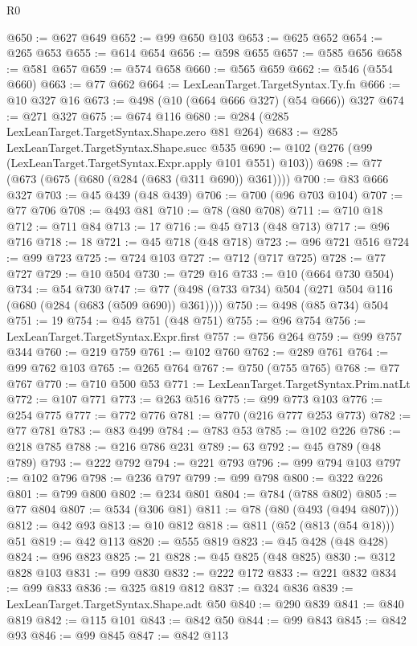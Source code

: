 \begin{lexlean}{R0}
\begin{coremodule}
@650 := @627 @649
@652 := @99 @650 @103
@653 := @625 @652
@654 := @265 @653
@655 := @614 @654
@656 := @598 @655
@657 := @585 @656
@658 := @581 @657
@659 := @574 @658
@660 := @565 @659
@662 := @546 (@554 @660)
@663 := @77 @662
@664 := LexLeanTarget.TargetSyntax.Ty.fn
@666 := @10 @327 @16
@673 := @498 (@10 (@664 @666 @327) (@54 @666)) @327
@674 := @271 @327
@675 := @674 @116
@680 := @284 (@285 LexLeanTarget.TargetSyntax.Shape.zero @81 @264)
@683 := @285 LexLeanTarget.TargetSyntax.Shape.succ @535
@690 := @102 (@276 (@99 (LexLeanTarget.TargetSyntax.Expr.apply @101 @551) @103))
@698 := @77 (@673 (@675 (@680 (@284 (@683 (@311 @690)) @361))))
@700 := @83 @666 @327
@703 := @45 @439 (@48 @439)
@706 := @700 (@96 @703 @104)
@707 := @77 @706
@708 := @493 @81
@710 := @78 (@80 @708)
@711 := @710 @18
@712 := @711 @84
@713 := 17
@716 := @45 @713 (@48 @713)
@717 := @96 @716
@718 := 18
@721 := @45 @718 (@48 @718)
@723 := @96 @721 @516
@724 := @99 @723
@725 := @724 @103
@727 := @712 (@717 @725)
@728 := @77 @727
@729 := @10 @504
@730 := @729 @16
@733 := @10 (@664 @730 @504)
@734 := @54 @730
@747 := @77 (@498 (@733 @734) @504 (@271 @504 @116 (@680 (@284 (@683 (@509 @690)) @361))))
@750 := @498 (@85 @734) @504
@751 := 19
@754 := @45 @751 (@48 @751)
@755 := @96 @754
@756 := LexLeanTarget.TargetSyntax.Expr.first
@757 := @756 @264
@759 := @99 @757 @344
@760 := @219 @759
@761 := @102 @760
@762 := @289 @761
@764 := @99 @762 @103
@765 := @265 @764
@767 := @750 (@755 @765)
@768 := @77 @767
@770 := @710 @500 @53
@771 := LexLeanTarget.TargetSyntax.Prim.natLt
@772 := @107 @771
@773 := @263 @516
@775 := @99 @773 @103
@776 := @254 @775
@777 := @772 @776
@781 := @770 (@216 @777 @253 @773)
@782 := @77 @781
@783 := @83 @499
@784 := @783 @53
@785 := @102 @226
@786 := @218 @785
@788 := @216 @786 @231
@789 := 63
@792 := @45 @789 (@48 @789)
@793 := @222 @792
@794 := @221 @793
@796 := @99 @794 @103
@797 := @102 @796
@798 := @236 @797
@799 := @99 @798
@800 := @322 @226
@801 := @799 @800
@802 := @234 @801
@804 := @784 (@788 @802)
@805 := @77 @804
@807 := @534 (@306 @81)
@811 := @78 (@80 (@493 (@494 @807)))
@812 := @42 @93
@813 := @10 @812
@818 := @811 (@52 (@813 (@54 @18))) @51
@819 := @42 @113
@820 := @555 @819
@823 := @45 @428 (@48 @428)
@824 := @96 @823
@825 := 21
@828 := @45 @825 (@48 @825)
@830 := @312 @828 @103
@831 := @99 @830
@832 := @222 @172
@833 := @221 @832
@834 := @99 @833
@836 := @325 @819 @812
@837 := @324 @836
@839 := LexLeanTarget.TargetSyntax.Shape.adt @50
@840 := @290 @839
@841 := @840 @819
@842 := @115 @101
@843 := @842 @50
@844 := @99 @843
@845 := @842 @93
@846 := @99 @845
@847 := @842 @113

\end{coremodule}
\end{lexlean}
